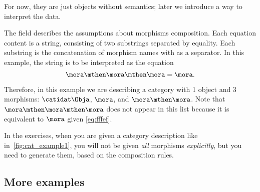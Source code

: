 For now, they are just objects without semantics; later we introduce a way to interpret the data.

The field  describes the assumptions about morphisms composition.
Each equation content is a string, consisting of two substrings separated by equality.
Each substring is the concatenation of morphism names with \str{;} as a separator. In this example, the string  is to be interpreted as the equation
\begin{equation}
    \label{eq:fffef}
    \mora \mthen \mora \mthen \mora = \mora.
\end{equation}

Therefore, in this example we are describing a category with 1 object and 3 morphisms: $\catidat\Obja$, $\mora$, and $\mora\mthen\mora$.
Note that $\mora \mthen \mora \mthen \mora$ does not appear in this list because it is equivalent to $\mora$ given \cref{eq:fffef}.

In the exercises, when you are given a category description like in~\cref{fig:cat_example1}, you will not be given \emph{all} morphisms \emph{explicitly}, but you need to generate them, based on the composition rules.

\subsection{More examples}


\seprule


\vfill\pagebreak



\seprule

\seprule
{}

